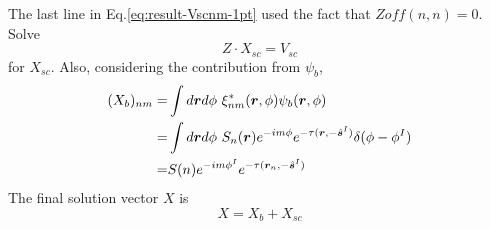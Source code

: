 \documentclass [10pt,letterpaper]{article}
\renewcommand{\vec}{\vectorsym}
\newcommand{\unitvec}[1]{\hat{\vec{#1}}}
\begin{document}
The last line in Eq.\eqref{eq:result-Vscnm-1pt} used the fact that $Zoff(n,n)=0$.
\\
Solve
\begin{equation} \label{eq:Z-Xsc-Vsc}
	Z\cdot X_{sc}=V_{sc}
\end{equation}
for $X_{sc}$.
Also, considering the contribution from $\psi_b$,
\begin{equation} \label{eq:result-Xbnm-1pt}
	\begin{split} 
		(X_b)_{n m}
		=&
		\int d\vec{r} d\phi
		\ \xi^*_{n m}(\vec{r},\phi)
		\psi_b(\vec{r},\phi)
		\\
		=& 
		\int d\vec{r} d\phi
		\ S_n(\vec{r})
		e^{-i m \phi}
		e^{-\tau(\vec{r},-\unitvec{s}^I)}
		\delta(\phi-\phi^I) 
		\\
		=& 
		S(n)
		e^{-i m \phi^I}
		e^{-\tau(\vec{r}_n,-\unitvec{s}^I)}
	\end{split}
\end{equation}
The final solution vector $X$ is
\begin{equation} \label{eq:X-Xb-Xsc}
	X=X_b+X_{sc}
\end{equation}
\end{document}
